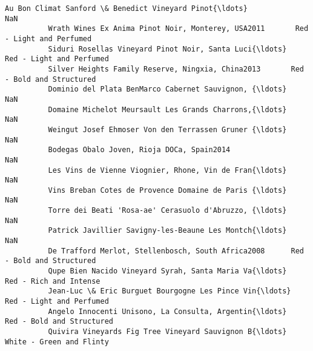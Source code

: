 \documentclass[11pt]{article}
\begin{document}
\begin{Verbatim}[commandchars=\\\{\}]
          Au Bon Climat Sanford \& Benedict Vineyard Pinot{\ldots}                            NaN   
          Wrath Wines Ex Anima Pinot Noir, Monterey, USA2011       Red - Light and Perfumed   
          Siduri Rosellas Vineyard Pinot Noir, Santa Luci{\ldots}       Red - Light and Perfumed   
          Silver Heights Family Reserve, Ningxia, China2013       Red - Bold and Structured   
          Dominio del Plata BenMarco Cabernet Sauvignon, {\ldots}                            NaN   
          Domaine Michelot Meursault Les Grands Charrons,{\ldots}                            NaN   
          Weingut Josef Ehmoser Von den Terrassen Gruner {\ldots}                            NaN   
          Bodegas Obalo Joven, Rioja DOCa, Spain2014                                    NaN   
          Les Vins de Vienne Viognier, Rhone, Vin de Fran{\ldots}                            NaN   
          Vins Breban Cotes de Provence Domaine de Paris {\ldots}                            NaN   
          Torre dei Beati 'Rosa-ae' Cerasuolo d'Abruzzo, {\ldots}                            NaN   
          Patrick Javillier Savigny-les-Beaune Les Montch{\ldots}                            NaN   
          De Trafford Merlot, Stellenbosch, South Africa2008      Red - Bold and Structured   
          Qupe Bien Nacido Vineyard Syrah, Santa Maria Va{\ldots}         Red - Rich and Intense   
          Jean-Luc \& Eric Burguet Bourgogne Les Pince Vin{\ldots}       Red - Light and Perfumed   
          Angelo Innocenti Unisono, La Consulta, Argentin{\ldots}      Red - Bold and Structured   
          Quivira Vineyards Fig Tree Vineyard Sauvignon B{\ldots}       White - Green and Flinty   
          

\end{Verbatim}
\end{document}
